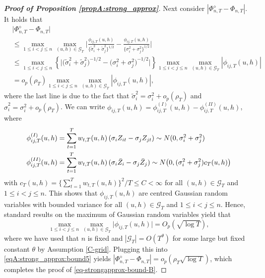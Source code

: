 \begin{proof}[\textnormal{\textbf{Proof of Proposition \ref{propA:strong_approx}}}]
Next consider $|\Phi_{n, T}^{\diamond} - \Phi_{n, T}|$. It holds that
\begin{align}
 & \big| \Phi_{n, T}^{\diamond} - \Phi_{n, T} \big| \nonumber \\
 & \le \max_{1\leq i< j \leq n}\max_{(u,h) \in \mathcal{G}_T} \Big|\frac{\phi_{ij, T}(u,h)}{\{\widetilde{\sigma}_i^2 + \widetilde{\sigma}_j^2 \}^{1/2}} - \frac{\phi_{ij, T}(u,h)}{\{{\sigma}_i^2 + {\sigma}_j^2 \}^{1/2}}\Big| \nonumber \\
 & \le \max_{1 \le i < j \le n} \left\{ \Big|\big(\widetilde{\sigma}_i^2 + \widetilde{\sigma}_j^2 \big)^{-1/2} - \big(\sigma_i^2 + \sigma_j^2 \big)^{-1/2}\Big| \right\} \max_{1 \le i < j \le n} \max_{(u,h) \in \mathcal{G}_T} \left|\phi_{ij,T}(u,h)\right| \nonumber \\
 & = o_p(\rho_T)  \max_{1 \le i < j \le n} \max_{(u,h) \in \mathcal{G}_T} \left|\phi_{ij,T}(u,h)\right|, \label{eqA:strong_approx:bound5}
\end{align}
where the last line is due to the fact that $\widetilde{\sigma}_i^2 = \sigma_i^2 + o_p(\rho_T)$ and $\widehat{\sigma}_i^2 = \sigma_i^2 + o_p(\rho_T)$. We can write $\phi_{ij, T}(u,h) = \phi_{ij, T}^{(I)}(u,h) - \phi_{ij, T}^{(II)}(u,h)$, where
\begin{align*} 
\phi_{ij, T}^{(I)}(u,h) & = \sum\limits_{t=1}^T w_{t,T}(u,h) \, (\sigma_i Z_{it} - \sigma_j Z_{jt}) \sim N(0,{\sigma}^2_i + {\sigma}^2_j) \\
\phi_{ij, T}^{(II)}(u,h) & = \sum\limits_{t=1}^T w_{t,T}(u,h) \, ( \sigma_i \bar{Z}_i - \sigma_j \bar{Z}_j) \sim N\big(0, (\sigma_i^2 + \sigma_j^2) c_T(u,h)\big) 
\end{align*}
with $c_T(u,h) = \{\sum_{t=1}^T w_{t, T}(u, h)\}^2/T \le C < \infty$ for all $(u,h) \in \mathcal{G}_T$ and $1\le i < j \le n$. This shows that $\phi_{ij, T}(u,h)$ are centred Gaussian random variables with bounded variance for all $(u,h) \in \mathcal{G}_T$ and $1\le i < j \le n$. Hence, standard results on the maximum of Gaussian random variables yield that 
\begin{equation}\label{eq:phi-bound-max-Gaussians}
\max_{1\leq i< j \leq n}\max_{(u,h) \in \mathcal{G}_T} \big|\phi_{ij, T}(u,h)\big| = O_p(\sqrt{\log T}),
\end{equation}
where we have used that $n$ is fixed and $|\mathcal{G}_T| = O(T^\theta)$ for some large but fixed constant $\theta$ by Assumption \ref{C-grid}. Plugging this into \eqref{eqA:strong_approx:bound5} yields 
$| \Phi_{n, T}^{\diamond} - \Phi_{n, T} | = o_p(\rho_T \sqrt{\log T})$, which completes the proof of \eqref{eq-strongapprox-bound-B}.
\end{proof}


